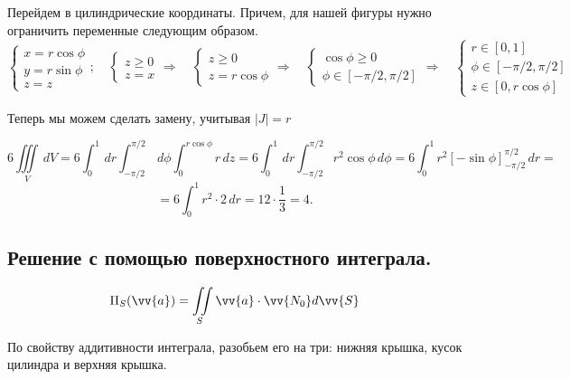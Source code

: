 Перейдем в цилиндрические координаты. Причем, для нашей фигуры нужно ограничить переменные следующим образом. 
$$
\begin{cases}
    x=r\cos{\phi}\\
    y=r\sin{\phi}\\
    z=z
\end{cases} ; \quad
\begin{cases}
    z\geq0\\
    z=x
\end{cases} \Rightarrow \quad
\begin{cases}
    z\geq0\\
    z = r\cos{\phi}
\end{cases} \Rightarrow \quad
\begin{cases}
    \cos{\phi} \geq 0 \\
    \phi \in [-\pi/2, \pi/2]
\end{cases} \Rightarrow \quad
\begin{cases}
    r \in [0,1]\\
    \phi \in [-\pi/2, \pi/2]\\
    z\in[0, r\cos{\phi}]
\end{cases}$$

Теперь мы можем сделать замену, учитывая $\left| J\right| = r$ 

$$6 \iiint \limits_V \,dV = 6 \int_0^1\,dr \int_{-\pi/2}^{\pi/2} \,d\phi \int_0^{r\cos{\phi}} r\, dz = 6 \int_0^1\,dr \int_{-\pi/2}^{\pi/2} r^2\cos{\phi}\,d\phi = 6 \int_0^1 r^2 \left[-\sin{\phi}\right]_{-\pi/2}^{\pi/2} \,dr =$$ 
$$= 6 \int_0^1 r^2 \cdot 2 \,dr = 12 \cdot \dfrac{1}{3} = \boxed{4}.$$


\subsection{Решение с помощью поверхностного интеграла.}

$$\Pi_S(\vv{a}) = \iint \limits_S \vv{a} \cdot \vv{N_0} d\vv{S}$$

По свойству аддитивности интеграла, разобьем его на три: нижняя крышка, кусок цилиндра и верхняя крышка. 

